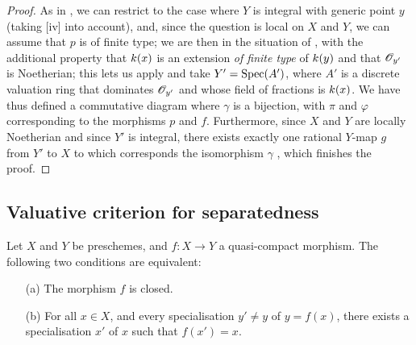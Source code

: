 \begin{proof}
As in , we can restrict to the case where $Y$ is integral with generic point $y$ (taking [iv] into account), and, since the question is local on $X$ and $Y$, we can assume that $p$ is of finite type;
we are then in the situation of , with the additional property that $k(x)$ is an extension \emph{of finite type} of $k(y)$  and that $\mathscr{O}_{y'}$ is Noetherian;
this lets us apply  and take $Y'=\operatorname{Spec}(A')$, where $A'$ is a discrete valuation ring that dominates $\mathscr{O}_{y'}$ and whose field of fractions is $k(x)$.
We have thus defined a commutative diagram  where $\gamma$ is a bijection, with $\pi$ and $\varphi$ corresponding to the morphisms $p$ and $f$.
Furthermore, since $X$ and $Y$ are locally Noetherian  and since $Y'$ is integral, there exists exactly one rational $Y$-map $g$ from $Y'$ to $X$ to which corresponds the isomorphism $\gamma$ , which finishes the proof.
\end{proof}

\subsection{Valuative criterion for separatedness}
\label{subsection:II.7.2}

\begin{proposition}[7.2.1]
\label{II.7.2.1}
Let $X$ and $Y$ be preschemes, and $f:X\to Y$ a quasi-compact morphism.
The following two conditions are equivalent:
\begin{enumerate}
    \item[\rm{(a)}] The morphism $f$ is closed.
    \item[\rm{(b)}] For all $x\in X$, and every specialisation $y'\neq y$ of $y=f(x)$, there exists a specialisation $x'$ of $x$ such that $f(x')=x$.
\end{enumerate}
\end{proposition}

